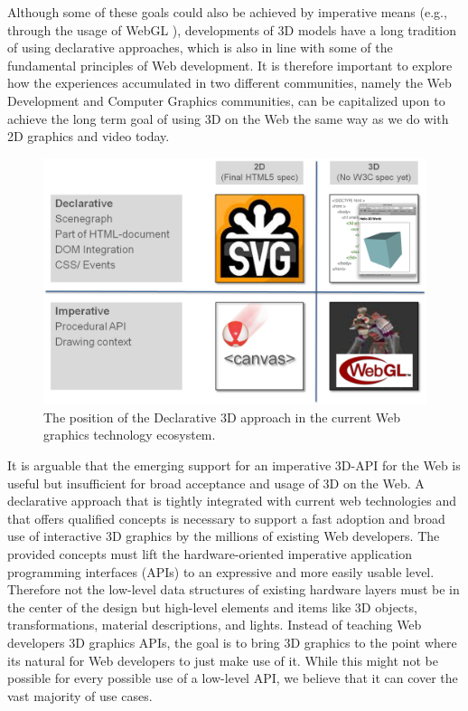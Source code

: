 \documentclass[review]{acmsiggraph}
\begin{document}
Although some of these goals could also be achieved by imperative means (e.g., through the usage of WebGL \cite{Khronos-WebGL}), developments of 3D models have a long tradition of using declarative approaches, which is also in line with some of the fundamental principles of Web development. It is therefore important to explore how the experiences accumulated in two different communities, namely the Web Development and Computer Graphics communities, can be capitalized upon to achieve the long term goal of using 3D on the Web the same way as we do with 2D graphics and video today.

\begin{figure}[ht]
  \centering
  \includegraphics[width=\linewidth]{images/Declarative3d.png}
  \caption{The position of the Declarative 3D approach in the current Web graphics technology ecosystem.}
  \label{fig:DeclarativeVsImperative}
\end{figure}

It is arguable that the emerging support for an imperative 3D-API for the Web is useful but insufficient for broad acceptance and usage of 3D on the Web. A declarative approach that is tightly integrated with current web technologies and that offers qualified concepts is necessary to support a fast adoption and broad use of interactive 3D graphics by the millions of existing Web developers. The provided concepts must lift the hardware-oriented imperative application programming interfaces (APIs) to an expressive and more easily usable level. Therefore not the low-level data structures of existing hardware layers must be in the center of the design but high-level elements and items like 3D objects, transformations, material descriptions, and lights. Instead of teaching Web developers 3D graphics APIs, the goal is to bring 3D graphics to the point where its natural for Web developers to just make use of it. While this might not be possible for every possible use of a low-level API, we believe that it can cover the vast majority of use cases.
\end{document}
